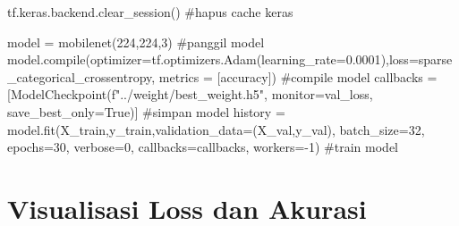 \documentclass[
  letterpaper,
  DIV=11,
  numbers=noendperiod]{scrreprt}
\newenvironment{Shaded}{\begin{snugshade}}{\end{snugshade}}
\newcommand{\BuiltInTok}[1]{\textcolor[rgb]{0.00,0.23,0.31}{#1}}
\newcommand{\CommentTok}[1]{\textcolor[rgb]{0.37,0.37,0.37}{#1}}
\newcommand{\DecValTok}[1]{\textcolor[rgb]{0.68,0.00,0.00}{#1}}
\newcommand{\FloatTok}[1]{\textcolor[rgb]{0.68,0.00,0.00}{#1}}
\newcommand{\NormalTok}[1]{\textcolor[rgb]{0.00,0.23,0.31}{#1}}
\newcommand{\OperatorTok}[1]{\textcolor[rgb]{0.37,0.37,0.37}{#1}}
\newcommand{\SpecialStringTok}[1]{\textcolor[rgb]{0.13,0.47,0.30}{#1}}
\newcommand{\StringTok}[1]{\textcolor[rgb]{0.13,0.47,0.30}{#1}}
\newcommand{\VariableTok}[1]{\textcolor[rgb]{0.07,0.07,0.07}{#1}}
\begin{document}
\begin{Shaded}
\begin{Highlighting}[]
\NormalTok{tf.keras.backend.clear\_session() }\CommentTok{\#hapus cache keras  }

\NormalTok{model }\OperatorTok{=}\NormalTok{ mobilenet(}\DecValTok{224}\NormalTok{,}\DecValTok{224}\NormalTok{,}\DecValTok{3}\NormalTok{) }\CommentTok{\#panggil model}
\NormalTok{model.}\BuiltInTok{compile}\NormalTok{(optimizer}\OperatorTok{=}\NormalTok{tf.optimizers.Adam(learning\_rate}\OperatorTok{=}\FloatTok{0.0001}\NormalTok{),loss}\OperatorTok{=}\StringTok{\textquotesingle{}sparse\_categorical\_crossentropy\textquotesingle{}}\NormalTok{, metrics }\OperatorTok{=}\NormalTok{ [}\StringTok{\textquotesingle{}accuracy\textquotesingle{}}\NormalTok{]) }\CommentTok{\#compile model}
\NormalTok{callbacks }\OperatorTok{=}\NormalTok{ [ModelCheckpoint(}\SpecialStringTok{f"../weight/best\_weight.h5"}\NormalTok{, monitor}\OperatorTok{=}\StringTok{\textquotesingle{}val\_loss\textquotesingle{}}\NormalTok{, save\_best\_only}\OperatorTok{=}\VariableTok{True}\NormalTok{)] }\CommentTok{\#simpan model}
\NormalTok{history }\OperatorTok{=}\NormalTok{ model.fit(X\_train,y\_train,validation\_data}\OperatorTok{=}\NormalTok{(X\_val,y\_val), batch\_size}\OperatorTok{=}\DecValTok{32}\NormalTok{, epochs}\OperatorTok{=}\DecValTok{30}\NormalTok{,}
\NormalTok{                          verbose}\OperatorTok{=}\DecValTok{0}\NormalTok{, callbacks}\OperatorTok{=}\NormalTok{callbacks, workers}\OperatorTok{={-}}\DecValTok{1}\NormalTok{) }\CommentTok{\#train model}
\end{Highlighting}
\end{Shaded}

\hypertarget{visualisasi-loss-dan-akurasi}{%
\section*{Visualisasi Loss dan
Akurasi}\label{visualisasi-loss-dan-akurasi}}

\end{document}
